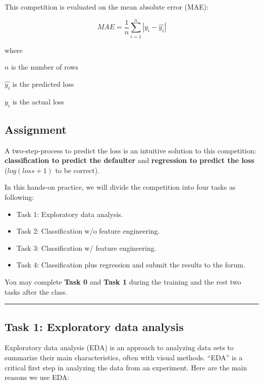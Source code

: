 \documentclass[11pt]{article}
\providecommand{\tightlist}{%
      \setlength{\itemsep}{0pt}\setlength{\parskip}{0pt}}
\begin{document}
This competition is evaluated on the mean absolute error (MAE):

\[MAE = \frac{1}{n} \sum_{i=1}^{n}{|y_i - \hat{y_i}|}\]

where

\(n\) is the number of rows

\(\hat{y_i}\) is the predicted loss

\(y_i\) is the actual loss

\hypertarget{assignment}{%
\subsection{Assignment}\label{assignment}}

A two-step-process to predict the loss is an intuitive solution to this
competition: \textbf{classification to predict the defaulter} and
\textbf{regression to predict the loss} (\(log(loss+1)\) to be correct).

In this hands-on practice, we will divide the competition into four
tasks as following:

\begin{itemize}
\tightlist
\item
  Task 1: Exploratory data analysis.
\item
  Task 2: Classification w/o feature engineering.
\item
  Task 3: Classification w/ feature engineering.
\item
  Task 4: Classification plus regression and submit the results to the
  forum.
\end{itemize}

You may complete \textbf{Task 0} and \textbf{Task 1} during the training
and the rest two tasks after the class.

\begin{center}\rule{0.5\linewidth}{\linethickness}\end{center}

\hypertarget{task-1-exploratory-data-analysis}{%
\subsection{Task 1: Exploratory data
analysis}\label{task-1-exploratory-data-analysis}}

Exploratory data analysis (EDA) is an approach to analyzing data sets to
summarize their main characteristics, often with visual methods. ``EDA''
is a critical first step in analyzing the data from an experiment. Here
are the main reasons we use EDA:
\end{document}
